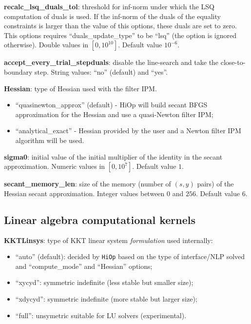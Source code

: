 \documentclass[11pt]{article}
\newcounter{line}
\newcommand{\Hi}{\texttt{HiOp}\xspace}
\begin{document}
\medskip

\noindent \textbf{recalc\_lsq\_duals\_tol}: threshold for inf-norm under which the LSQ computation of duals is used. If the inf-norm of the duals of the equality constraints is larger than the value of this options, these duals are set to zero. This options requires ``duals\_update\_type'' to be ``lsq'' (the option is ignored otherwise). Double values in $[0,10^{10}]$. Default value $10^{-6}$.


\medskip

\noindent \textbf{accept\_every\_trial\_stepduals}: disable the line-search and take the close-to-boundary step. String values: ``no'' (default) and ``yes''.

\medskip

\noindent \textbf{Hessian}: type of Hessian used with the filter IPM.
\begin{itemize}
\item ``quasinewton\_approx'' (default) - HiOp will build secant BFGS approximation for the Hessian and use a quasi-Newton filter IPM;
\item ``analytical\_exact'' - Hessian provided by the user and a Newton filter IPM algorithm will be used.
\end{itemize}

\medskip

\noindent \textbf{sigma0}: initial value of the initial multiplier of the identity in the secant approximation. Numeric values in $[0,10^7]$. Default value $1$.

\medskip

\noindent \textbf{secant\_memory\_len}: size of the memory (number of $(s,y)$ pairs) of the Hessian secant approximation. Integer values between $0$ and $256$. Default value $6$.

\subsection{Linear algebra computational kernels}

\noindent \textbf{KKTLinsys}: type of KKT linear system \textit{formulation} used internally:
\begin{itemize}
\item ``auto'' (default): decided by \Hi based on the type of interface/NLP solved and ``compute\_mode'' and ``Hessian'' options;
\item ``xycyd'': symmetric indefinite (less stable but smaller size);
\item ``xdycyd'': symmetric indefinite (more stable but  larger size);
\item  ``full'': unsymetric suitable for LU solvers (experimental).
\end{itemize}
\end{document}
